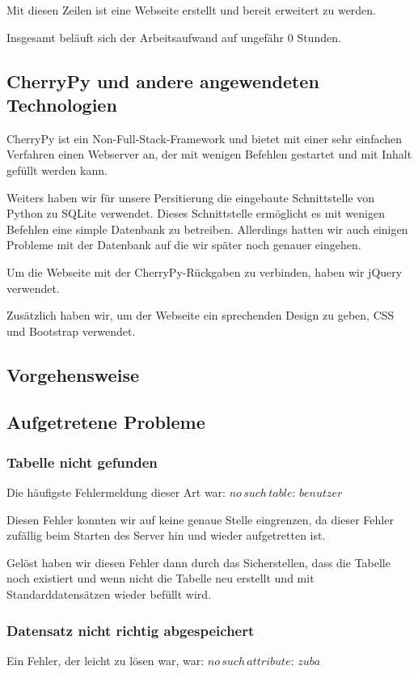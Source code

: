 Mit diesen Zeilen ist eine Webseite erstellt und bereit erweitert zu werden.

Insgesamt beläuft sich der Arbeitsaufwand auf ungefähr 0 Stunden.

\subsection{CherryPy und andere angewendeten Technologien}

CherryPy ist ein Non-Full-Stack-Framework und bietet mit einer sehr einfachen Verfahren einen Webserver an, der mit wenigen Befehlen gestartet und mit Inhalt gefüllt werden kann.

Weiters haben wir für unsere Persitierung die eingebaute Schnittstelle von Python zu SQLite verwendet. Dieses Schnittstelle ermöglicht es mit wenigen Befehlen eine simple Datenbank zu betreiben. Allerdings hatten wir auch einigen Probleme mit der Datenbank auf die wir später noch genauer eingehen.

Um die Webseite mit der CherryPy-Rückgaben zu verbinden, haben wir jQuery verwendet. 

Zusätzlich haben wir, um der Webseite ein sprechenden Design zu geben, CSS und Bootstrap verwendet. 


\subsection{Vorgehensweise}


\subsection{Aufgetretene Probleme}

\subsubsection{Tabelle nicht gefunden}
Die häufigste Fehlermeldung dieser Art war: $ no\,such\,table:\,benutzer $ 

Diesen Fehler konnten wir auf keine genaue Stelle eingrenzen, da dieser Fehler zufällig beim Starten des Server hin und wieder aufgetretten ist. 

Gelöst haben wir diesen Fehler dann durch das Sicherstellen, dass die Tabelle noch existiert und wenn nicht die Tabelle neu erstellt und mit Standarddatensätzen wieder befüllt wird.

\subsubsection{Datensatz nicht richtig abgespeichert}
Ein Fehler, der leicht zu lösen war, war: $ no\,such\,attribute:\,zuba $ 


